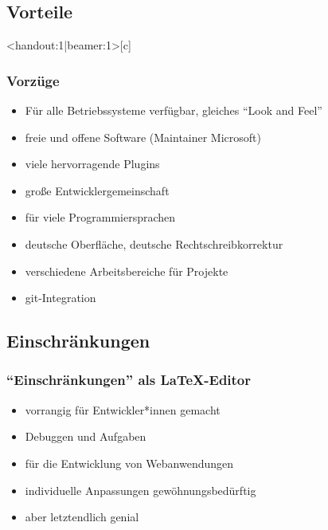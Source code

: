 \documentclass[t, %
							xcolor=dvipsnames,%
							hyperref={bookmarks,colorlinks},%
							]%
							{beamer}
\begin{document}
    \subsection{Vorteile}
		\label{sub:Vorteile}
		\begin{frame}<handout:1|beamer:1>[c]
			\frametitle{Vorzüge}
			\begin{itemize}
				\item Für alle Betriebssysteme verfügbar, gleiches \enquote{Look and Feel}
				\item freie und offene Software (Maintainer Microsoft)
				\item viele hervorragende Plugins
				\item große Entwicklergemeinschaft
				\item für viele Programmiersprachen
				\item deutsche Oberfläche, deutsche Rechtschreibkorrektur
				\item verschiedene Arbeitsbereiche für Projekte
				\item git-Integration
			\end{itemize}
		\end{frame}
		
		\subsection{Einschränkungen}
		\label{sub:Einschraenkungen}
		\begin{frame}
			\frametitle{\enquote{Einschränkungen} als \LaTeX-Editor}
			\begin{itemize}
				\item vorrangig für Entwickler*innen gemacht
				\item Debuggen und Aufgaben
				\item für die  Entwicklung von Webanwendungen 
				\item individuelle Anpassungen gewöhnungsbedürftig
				\item aber letztendlich genial
			\end{itemize}
		\end{frame}
\end{document}
